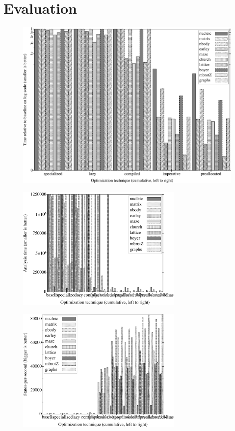 \documentclass[preprint,onecolumn,9pt]{sigplanconf} %
\begin{document}
\section{Evaluation}
\label{sec:eval}

\begin{figure}
\begin{center}
\includegraphics[width=6in]{rel-time.ps}
\end{center}
\end{figure}

\begin{figure}
\begin{center}
\includegraphics[width=3.2in]{abs-time.ps}
\end{center}
\end{figure}

\begin{figure}
\begin{center}
\includegraphics[width=3.2in]{state-per-sec.ps}
\end{center}
\end{figure}
\end{document}
